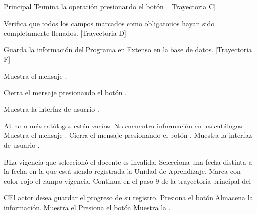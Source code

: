 \begin{UCtrayectoria}{Principal}
	\UCpaso[\UCactor] Termina la operación presionando el botón . [Trayectoria C]
        
    \UCpaso Verifica que todos los campos marcados como obligatorios hayan sido completamente llenados. [Trayectoria D]
    
    \UCpaso Guarda la información del Programa en Extenso en la base de datos. [Trayectoria F]
    
    \UCpaso Muestra el mensaje .
    
    \UCpaso[\UCactor] Cierra el mensaje presionando el botón .
    
    \UCpaso Muestra la interfaz de usuario .
\end{UCtrayectoria}


\begin{UCtrayectoriaA}{A}{Uno o más catálogos están vacíos.}
	\UCpaso No encuentra información en los catálogos.
    \UCpaso Muestra el mensaje .
    \UCpaso[\UCactor] Cierra el mensaje presionando el botón .
	\UCpaso Muestra la interfaz de usuario .
\end{UCtrayectoriaA}


\begin{UCtrayectoriaA}{B}{La vigencia que seleccionó el docente es invalida.}
	\UCpaso[\UCactor] Selecciona una fecha distinta a la fecha en la que está siendo registrada la Unidad de Aprendizaje.
	\UCpaso Marca con color rojo el campo vigencia.
	\UCpaso Continua en el paso 9 de la trayectoria principal del 
\end{UCtrayectoriaA}


\begin{UCtrayectoriaA}{C}{El actor desea guardar el progreso de su registro.}
\UCpaso[\UCactor] Presiona el botón 
\UCpaso Almacena la información.
\UCpaso Muestra el 
\UCpaso[\UCactor] Presiona el botón  
\UCpaso Muestra la .
\end{UCtrayectoriaA}

